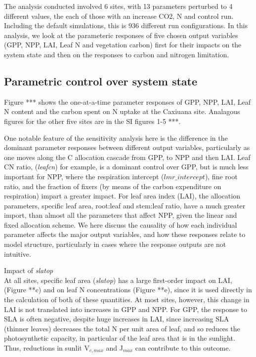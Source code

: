 \documentclass[draft,linenumbers]{agujournal}
\begin{document}
The analysis conducted involved 6 sites, with 13 parameters perturbed to 4 different values, the each of those with an increase CO2, N and control run. Including the default simulations, this is 936 different run configurations. In this analysis, we look at the parameteric responses of five chosen output variables (GPP, NPP, LAI, Leaf N and vegetation carbon) first for their impacts on the system state and then on the responses to carbon and nitrogen limitation. 

\subsection{Parametric control over system state}
Figure *** shows the one-at-a-time parameter responses of GPP, NPP, LAI, Leaf N content and the carbon spent on N uptake at the Caxiuana site. Analagous figures for the other five sites are in the SI figures 1-5 ***.

One notable feature of the sensitivity analysis here is the difference in the dominant parameter responses between different output variables, particularly as one moves along the C allocation cascade from GPP, to NPP and then LAI. Leaf CN ratio, (\emph{leafcn}) for example, is a dominant control over GPP, but is much less important for NPP, where the respiration intercept ($lmr\_{intercept}$), fine root ratio, and the fraction of fixers (by means of the carbon expenditure on respiration) impart a greater impact. For leaf area index (LAI), the allocation parameters, specific leaf area, root:leaf and stem:leaf ratio, have a much greater import, than almost all the parameters that affect NPP, given the linear and fixed allocation scheme. We here discuss the causality of how each individual parameter affects the major output variables, and how these responses relate to model structure, particularly in cases where the response outputs are not intuitive. 

Impact of \emph{slatop}\\
At all sites, specific leaf area (\emph{slatop}) has a large first-order impact on LAI, (Figure **c) and on leaf N concentrations (Figure **e), since it is used directly in the calculation of both of these quantities. At most sites, however, this change in LAI is not translated into increases in GPP and NPP. For GPP, the response to SLA is often negative, despite huge increases in LAI, since increasing SLA (thinner leaves) decreases the total N per unit area of leaf, and so reduces the photosynthetic capacity, in particular of the leaf area that is in the sunlight. Thus, reductions in sunlit V$_{c,max}$ and J$_{max}$ can contribute to this outcome.
\end{document}
